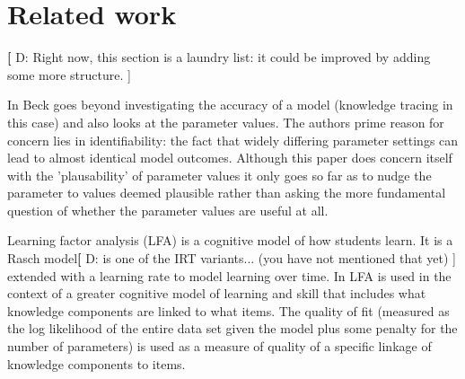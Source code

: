 \documentclass{scrartcl}
\providecommand{\comm}[1]{{\textbf[ #1 ]}}
\providecommand{\commd}[1]{\comm{D: {#1}}}
\begin{document}

\section{Related work}
\label{sec:RW}
\commd{Right now, this section is a laundry list: it could be improved by adding some more structure.}

In \cite{knowledgeproblem} Beck goes beyond investigating the accuracy of a model (knowledge tracing in this case) and also looks at the parameter values. The authors prime reason for concern lies in identifiability: the fact that widely differing parameter settings can lead to almost identical model outcomes. Although this paper does concern itself with the 'plausability' of parameter values it only goes so far as to nudge the parameter to values deemed plausible rather than asking the more fundamental question of whether the parameter values are useful at all.

Learning factor analysis (LFA) \cite{lfa} is a cognitive model of how students learn. It is a Rasch model\commd{is one of the IRT variants... (you have not mentioned that yet)} extended with a learning rate to model learning over time. In \cite{lfa} LFA is used in the context of a greater cognitive model of learning and skill that includes what knowledge components are linked to what items. The quality of fit (measured as the log likelihood of the entire data set given the model plus some penalty for the number of parameters) is used as a measure of quality of a specific linkage of knowledge components to items.
\end{document}
